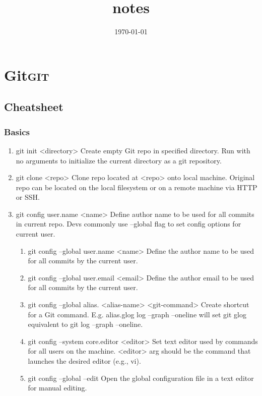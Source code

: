 \documentclass[11pt]{article}
\date{\today}
\title{notes}
\begin{document}
\maketitle
\tableofcontents

\section{Git\hfill{}\textsc{git}}
\label{sec-1}
\subsection{Cheatsheet}
\label{sec-1-1}
\subsubsection{Basics}
\label{sec-1-1-1}
\begin{enumerate}
\item git init <directory>
\label{sec-1-1-1-1}
Create empty Git repo in specified directory. Run with no arguments
to initialize the current directory as a git repository.
\item git clone <repo>
\label{sec-1-1-1-2}
Clone repo located at <repo> onto local machine. Original repo can be
located on the local filesystem or on a remote machine via HTTP or SSH.
\item git config user.name <name>
\label{sec-1-1-1-3}
Define author name to be used for all commits in current repo. Devs
commonly use --global flag to set config options for current user.
\begin{enumerate}
\item git config --global user.name <name>
\label{sec-1-1-1-3-1}
Define the author name to be used for all commits by the current user.
\item git config --global user.email <email>
\label{sec-1-1-1-3-2}
Define the author email to be used for all commits by the current user.
\item git config --global alias. <alias-name> <git-command>
\label{sec-1-1-1-3-3}
Create shortcut for a Git command. E.g. alias.glog log --graph
--oneline will set git glog equivalent to git log --graph --oneline.
\item git config --system core.editor <editor>
\label{sec-1-1-1-3-4}
Set text editor used by commands for all users on the machine. <editor>
arg should be the command that launches the desired editor (e.g., vi).
\item git config --global --edit
\label{sec-1-1-1-3-5}
Open the global configuration file in a text editor for manual editing.

\end{enumerate}
\end{enumerate}
\end{document}

